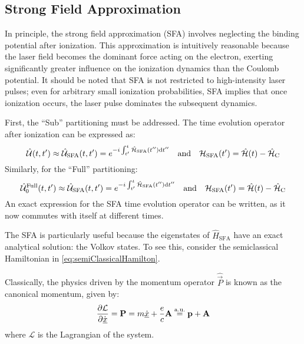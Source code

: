 \subsection{Strong Field Approximation}
In principle, the strong field approximation (SFA) involves neglecting the binding potential after ionization.
This approximation is intuitively reasonable because the laser field becomes the dominant force acting on the electron, exerting significantly greater influence on the ionization dynamics than the Coulomb potential.
It should be noted that SFA is not restricted to high-intensity laser pulses; even for arbitrary small ionization probabilities, SFA implies that once ionization occurs, the laser pulse dominates the subsequent dynamics.

First, the ``Sub'' partitioning must be addressed.
The time evolution operator after ionization can be expressed as:
\begin{equation*}
    \hat{\mathcal{U}}(t,t') \approx \hat{\mathcal{U}}_{\mathrm{SFA}}(t,t')=e^{-i \int_{t'}^{t} \hat{\mathcal{H}}_{\mathrm{SFA}}(t'') \mathrm{d} t''} \quad \text{and} \quad \mathcal{H}_{\mathrm{SFA}}(t') = \hat{\mathcal{H}}(t) - \hat{\mathcal{H}}_{\mathrm{C}}      \label{eq:sfa_formula}
\end{equation*}
Similarly, for the ``Full'' partitioning:
\begin{equation*}
    \hat{\mathcal{U}}^{\mathrm{Full}}_0(t,t') \approx \hat{\mathcal{U}}_{\mathrm{SFA}}(t,t')=e^{-i \int_{t'}^{t} \hat{\mathcal{H}}_{\mathrm{SFA}}(t'') \mathrm{d} t''} \quad \text{and} \quad \mathcal{H}_{\mathrm{SFA}}(t') = \hat{\mathcal{H}}(t) - \hat{\mathcal{H}}_{\mathrm{C}}      \label{eq:sfa_formula}
\end{equation*}
An exact expression for the SFA time evolution operator can be written, as it now commutes with itself at different times.

The SFA is particularly useful because the eigenstates of $\hat{H}_{\mathrm{SFA}}$ have an exact analytical solution: the Volkov states. 
To see this, consider the semiclassical Hamiltonian in \eqref{eq:semiClassicalHamilton}.

Classically, the physics driven by the momentum operator $\hat{\vec{P}}$ is known as the canonical momentum, given by:
\begin{equation}
    \frac{\partial \mathcal{L}}{\partial \dot{\underline{x}}} = \mathbf{P} = m\underline{\dot{x}} + \frac{e}{c}\mathbf{A} \stackrel{\mathrm{a.u.}}{=} \mathbf{p} + \mathbf{A}    \label{eq:canonicalMomentum}
\end{equation}
where $\mathcal{L}$ is the Lagrangian of the system.

